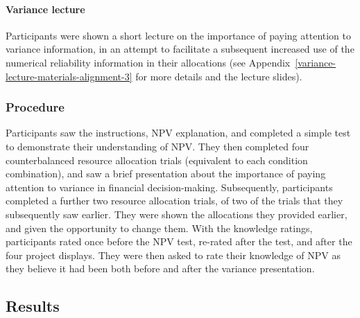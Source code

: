 \documentclass[a4paper, nobind, dvipsnames]{templates/ociamthesis}
\theoremstyle{definition}
\theoremstyle{definition}
\theoremstyle{definition}
\theoremstyle{definition}
\theoremstyle{remark}
\begin{document}
\hypertarget{variance-lecture}{%
\paragraph{Variance lecture}\label{variance-lecture}}

Participants were shown a short lecture on the importance of paying attention to
variance information, in an attempt to facilitate a subsequent increased use of
the numerical reliability information in their allocations (see
Appendix~\ref{variance-lecture-materials-alignment-3} for more details and the
lecture slides).

\hypertarget{procedure-alignment-3}{%
\subsubsection{Procedure}\label{procedure-alignment-3}}

Participants saw the instructions, NPV explanation, and completed a simple test
to demonstrate their understanding of NPV. They then completed four
counterbalanced resource allocation trials (equivalent to each condition
combination), and saw a brief presentation about the importance of paying
attention to variance in financial decision-making. Subsequently, participants
completed a further two resource allocation trials, of two of the trials that
they subsequently saw earlier. They were shown the allocations they provided
earlier, and given the opportunity to change them. With the knowledge ratings,
participants rated once before the NPV test, re-rated after the test, and after
the four project displays. They were then asked to rate their knowledge of NPV
as they believe it had been both before and after the variance presentation.

\hypertarget{results-1}{%
\subsection{Results}\label{results-1}}
\end{document}
